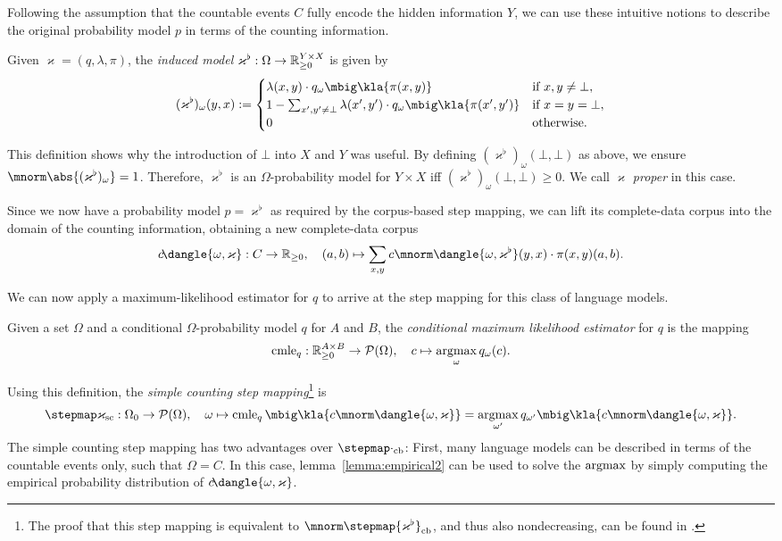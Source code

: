 Following the assumption that the countable events $C$ fully encode the hidden
information $Y$, we can use these intuitive notions to describe the original
probability model $p$ in terms of the counting information.

\begin{definition}
 Given $\varkappa=(q,\lambda,\pi)$, the \emph{induced model}
 $\varkappa^\flat:\Omega\to\mathbb R_{\geq0}^{Y\times X}$ is given by
 \[
  (\varkappa^\flat)_\omega(y,x) := \begin{cases}
   \lambda(x,y) \cdot q_\omega\mbig\kla{\pi(x,y)} & \text{if } x,y\neq\bot, \\
   1 - \sum_{x',y'\neq\bot} \lambda(x',y') \cdot q_\omega\mbig\kla{\pi(x',y')} & \text{if } x = y = \bot, \\
   0 & \text{otherwise}.
  \end{cases}
 \]
\end{definition}

This definition shows why the introduction of $\bot$ into $X$ and $Y$ was
useful. By defining $(\varkappa^\flat)_\omega(\bot,\bot)$ as above, we ensure
$\mnorm\abs{(\varkappa^\flat)_\omega} = 1$. Therefore, $\varkappa^\flat$ is an
$\Omega$-probability model for $Y\times X$ iff
$(\varkappa^\flat)_\omega(\bot,\bot) \geq 0$. We call $\varkappa$ \emph{proper}
in this case.

Since we now have a probability model $p = \varkappa^\flat$ as required by the
corpus-based step mapping, we can lift its complete-data corpus into the domain
of the counting information, obtaining a new complete-data corpus
\[
 c\!\dangle{\omega,\varkappa}: C \to \zr_{\geq0}, \quad
 (a,b) \mapsto \sum_{x,y} c\mnorm\dangle{\omega,\varkappa^\flat}(y,x) \cdot \pi(x,y)(a,b).
\]

We can now apply a maximum-likelihood estimator for $q$ to arrive at the step
mapping for this class of language models.

\begin{definition}
 Given a set $\Omega$ and a conditional $\Omega$-probability model $q$ for $A$
 and $B$, the \emph{conditional maximum likelihood estimator} for $q$ is the mapping
 \[
  \cmle_q: \zr_{\geq0}^{A\times B} \to \up(\Omega),
  \quad
  c \mapsto \argmax_\omega q_\omega(c).
 \]
\end{definition}

Using this definition, the \emph{simple counting step mapping}\footnote{The
proof that this step mapping is equivalent to
$\mnorm\stepmap{\varkappa^\flat}_\mathrm{cb}$, and thus also nondecreasing, can
be found in \cite[p.~13]{bucstuvog15}.} is
\[
 \stepmap\varkappa_\mathrm{sc}: \Omega_0 \to \up(\Omega), \quad
 \omega \mapsto \cmle_q\mbig\kla{c\mnorm\dangle{\omega,\varkappa}} = \argmax_{\omega'} q_{\omega'}\mbig\kla{c\mnorm\dangle{\omega,\varkappa}}.
\]
The simple counting step mapping has two advantages over
$\stepmap\cdot_\mathrm{cb}$: First, many language models can be described in
terms of the countable events only, such that $\Omega = C$. In this case,
lemma~\ref{lemma:empirical2} can be used to solve the $\argmax$ by simply
computing the empirical probability distribution of
$c\!\dangle{\omega,\varkappa}$.

